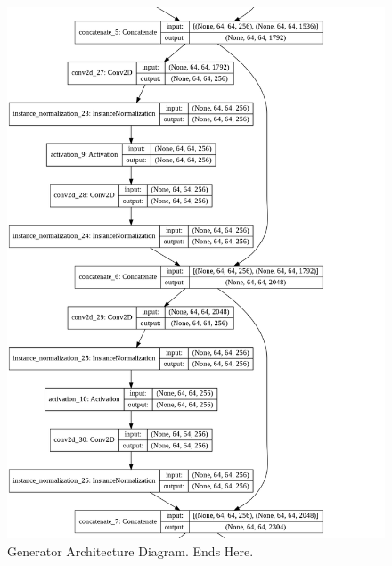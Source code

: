 \begin{figure}[H]
        \vspace*{2cm}
	    \begin{center} 
	    \includegraphics[scale=0.40]{images/generator_5.png}
	    \caption{Generator Architecture Diagram. Ends Here.}
	    \end{center}
\end{figure}


